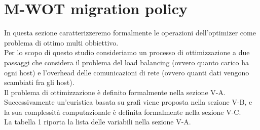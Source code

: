 \documentclass[11pt]{article}
\begin{document}
		\section{M-WOT migration policy}
		In questa sezione caratterizzeremo formalmente le operazioni dell'optimizer come problema di ottimo multi obbiettivo. \\
		Per lo scopo di questo studio consideriamo un processo di ottimizzazione a due passaggi che considera il problema del load balancing (ovvero quanto carico ha ogni host) e l'overhead delle comunicazioni di rete (ovvero quanti dati vengono scambiati fra gli host). \\
		Il problema di ottimizzazione è definito formalmente nella sezione V-A. \\ Successivamente un'euristica basata su grafi viene proposta nella sezione V-B, e la sua complessità computazionale è definita formalmente nella sezione V-C. \\
		La tabella 1 riporta la lista delle variabili nella sezione V-A.
\end{document}
